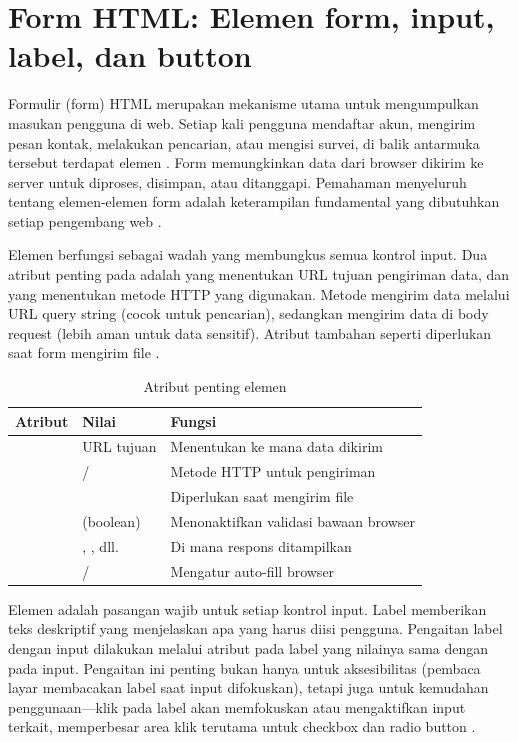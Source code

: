 \section{Form HTML: Elemen form, input, label, dan button}

Formulir (form) HTML merupakan mekanisme utama untuk mengumpulkan masukan pengguna di web. Setiap kali pengguna mendaftar akun, mengirim pesan kontak, melakukan pencarian, atau mengisi survei, di balik antarmuka tersebut terdapat elemen . Form memungkinkan data dari browser dikirim ke server untuk diproses, disimpan, atau ditanggapi. Pemahaman menyeluruh tentang elemen-elemen form adalah keterampilan fundamental yang dibutuhkan setiap pengembang web \cite{mdnHtmlIntro}.

Elemen  berfungsi sebagai wadah yang membungkus semua kontrol input. Dua atribut penting pada  adalah  yang menentukan URL tujuan pengiriman data, dan  yang menentukan metode HTTP yang digunakan. Metode  mengirim data melalui URL query string (cocok untuk pencarian), sedangkan  mengirim data di body request (lebih aman untuk data sensitif). Atribut tambahan seperti  diperlukan saat form mengirim file \cite{webdevHtml}.

\begin{table}[htbp]
\centering
\begin{tabular}{|P{2.5cm}|P{4cm}|P{5.5cm}|}
\hline
\textbf{Atribut} & \textbf{Nilai} & \textbf{Fungsi} \\
\hline
{} & URL tujuan & Menentukan ke mana data dikirim \\
\hline
{} &  /  & Metode HTTP untuk pengiriman \\
\hline
{} &  & Diperlukan saat mengirim file \\
\hline
{} & (boolean) & Menonaktifkan validasi bawaan browser \\
\hline
{} & , , dll. & Di mana respons ditampilkan \\
\hline
{} &  /  & Mengatur auto-fill browser \\
\hline
\end{tabular}
\caption{Atribut penting elemen }
\end{table}

Elemen  adalah pasangan wajib untuk setiap kontrol input. Label memberikan teks deskriptif yang menjelaskan apa yang harus diisi pengguna. Pengaitan label dengan input dilakukan melalui atribut  pada label yang nilainya sama dengan  pada input. Pengaitan ini penting bukan hanya untuk aksesibilitas (pembaca layar membacakan label saat input difokuskan), tetapi juga untuk kemudahan penggunaan---klik pada label akan memfokuskan atau mengaktifkan input terkait, memperbesar area klik terutama untuk checkbox dan radio button \cite{mdnAccessibility}.

